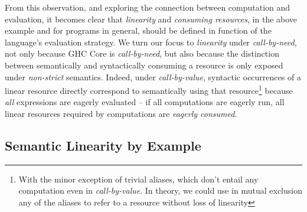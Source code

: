 \documentclass[acmsmall, screen, review]{acmart}
\begin{document}
From this observation, and exploring the connection between computation and evaluation,
it becomes clear that \emph{linearity} and \emph{consuming resources}, in the
above example and for programs in general, should be defined in function of the
language's evaluation strategy.
%
We turn our focus to \emph{linearity} under \emph{call-by-need}, not only
because GHC Core is \emph{call-by-need}, but also because the distinction
between semantically and syntactically consuming a resource is only exposed
under \emph{non-strict} semantics.
%
Indeed, under \emph{call-by-value}, syntactic occurrences of a linear resource
directly correspond to semantically using that resource\footnote{With the minor exception
of trivial aliases, which don't entail any computation even in
\emph{call-by-value}. In theory, we could use in mutual exclusion any of the
aliases to refer to a resource without loss of linearity} because \emph{all}
expressions are eagerly evaluated -- if all computations are eagerly run, all
linear resources required by computations are \emph{eagerly consumed}.

% 
% 
% 

\subsection{Semantic Linearity by Example\label{sec:semantic-linearity-examples}}
\end{document}
